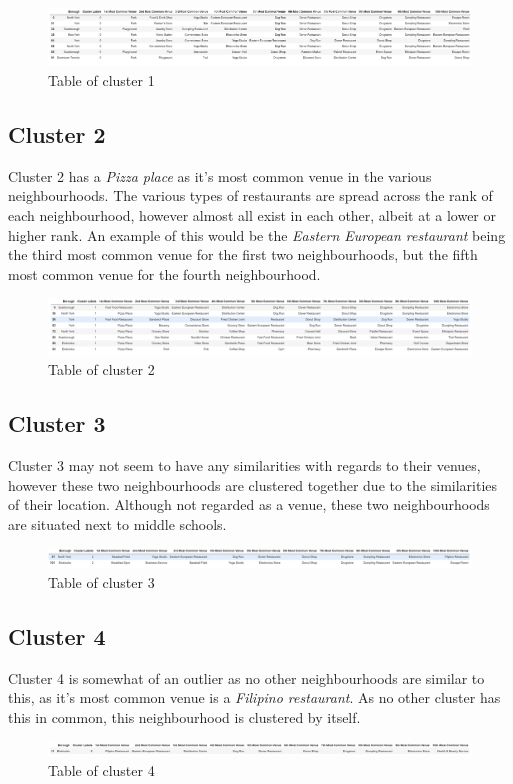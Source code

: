 \documentclass[12pt, conference]{IEEEtran}
\begin{document}
\begin{figure}[!h]
\center
\includegraphics[scale=0.4]{Cluster1}
\caption{Table of cluster 1}
\label{fig: Cluster1}
\end{figure}

\subsection{Cluster 2}
Cluster 2 has a \textit{Pizza place} as it's most common venue in the various neighbourhoods. The various types of restaurants are spread across the rank of each neighbourhood, however almost all exist in each other, albeit at a lower or higher rank. An example of this would be the \textit{Eastern European restaurant} being the third most common venue for the first two neighbourhoods, but the fifth most common venue for the fourth neighbourhood.
\begin{figure}[!h]
\center
\includegraphics[scale=0.4]{Cluster2}
\caption{Table of cluster 2}
\label{fig: Cluster2}
\end{figure}

\subsection{Cluster 3}
Cluster 3 may not seem to have any similarities with regards to their venues, however these two neighbourhoods are clustered together due to the similarities of their location. Although not regarded as a venue, these two neighbourhoods are situated next to middle schools.
\begin{figure}[!h]
\center
\includegraphics[scale=0.4]{Cluster3}
\caption{Table of cluster 3}
\label{fig: Cluster3}
\end{figure}

\subsection{Cluster 4}
Cluster 4 is somewhat of an outlier as no other neighbourhoods are similar to this, as it's most common venue is a \textit{Filipino restaurant}. As no other cluster has this in common, this neighbourhood is clustered by itself.
\begin{figure}[!h]
\center
\includegraphics[scale=0.4]{Cluster4}
\caption{Table of cluster 4}
\label{fig: Cluster4}
\end{figure}
\end{document}
